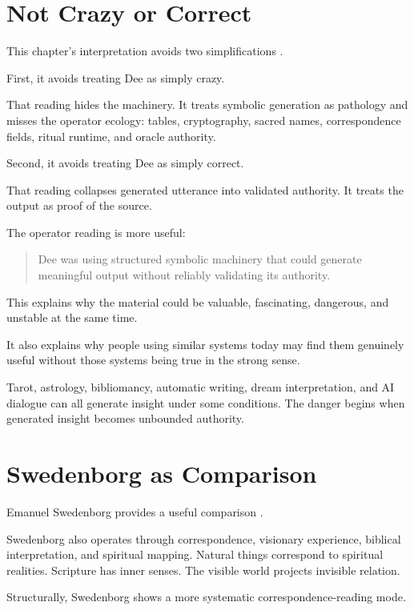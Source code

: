 \documentclass[11pt]{book}
\begin{document}
\section{Not Crazy or Correct}

This chapter’s interpretation avoids two simplifications \cite{DeeCasaubon1659TrueFaithfulRelation,Yates1964GiordanoBruno}.

First, it avoids treating Dee as simply crazy.

That reading hides the machinery. It treats symbolic generation as pathology and misses the operator ecology: tables, cryptography, sacred names, correspondence fields, ritual runtime, and oracle authority.

Second, it avoids treating Dee as simply correct.

That reading collapses generated utterance into validated authority. It treats the output as proof of the source.

The operator reading is more useful:

\begin{quote}
Dee was using structured symbolic machinery that could generate meaningful output without reliably validating its authority.
\end{quote}

This explains why the material could be valuable, fascinating, dangerous, and unstable at the same time.

It also explains why people using similar systems today may find them genuinely useful without those systems being true in the strong sense.

Tarot, astrology, bibliomancy, automatic writing, dream interpretation, and AI dialogue can all generate insight under some conditions. The danger begins when generated insight becomes unbounded authority.

\section{Swedenborg as Comparison}

Emanuel Swedenborg provides a useful comparison \cite{SwedenborgHeavenHell,Swedenborg1749Arcana}.

Swedenborg also operates through correspondence, visionary experience, biblical interpretation, and spiritual mapping. Natural things correspond to spiritual realities. Scripture has inner senses. The visible world projects invisible relation.

Structurally, Swedenborg shows a more systematic correspondence-reading mode.
\end{document}
